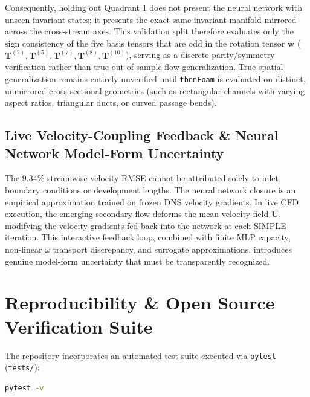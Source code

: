 \documentclass[11pt,a4paper]{article}
\begin{document}
Consequently, holding out Quadrant 1 does not present the neural network with unseen invariant states; it presents the exact same invariant manifold mirrored across the cross-stream axes. This validation split therefore evaluates only the sign consistency of the five basis tensors that are odd in the rotation tensor $\mathbf{w}$ ($\mathbf{T}^{(2)}, \mathbf{T}^{(5)}, \mathbf{T}^{(7)}, \mathbf{T}^{(8)}, \mathbf{T}^{(10)}$), serving as a discrete parity/symmetry verification rather than true out-of-sample flow generalization. True spatial generalization remains entirely unverified until \texttt{tbnnFoam} is evaluated on distinct, unmirrored cross-sectional geometries (such as rectangular channels with varying aspect ratios, triangular ducts, or curved passage bends).

\subsection{Live Velocity-Coupling Feedback \& Neural Network Model-Form Uncertainty}
The $9.34\%$ streamwise velocity RMSE cannot be attributed solely to inlet boundary conditions or development lengths. The neural network closure is an empirical approximation trained on frozen DNS velocity gradients. In live CFD execution, the emerging secondary flow deforms the mean velocity field $\mathbf{U}$, modifying the velocity gradients fed back into the network at each SIMPLE iteration. This interactive feedback loop, combined with finite MLP capacity, non-linear $\omega$ transport discrepancy, and surrogate approximations, introduces genuine model-form uncertainty that must be transparently recognized.

\section{Reproducibility \& Open Source Verification Suite}

The repository incorporates an automated test suite executed via \texttt{pytest} (\texttt{tests/}):
\begin{lstlisting}[language=bash]
pytest -v
\end{lstlisting}
\end{document}
